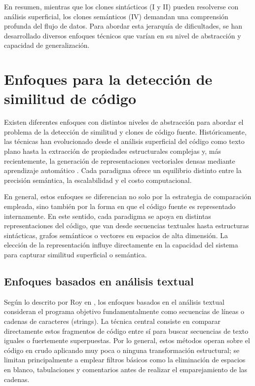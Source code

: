 
En resumen, mientras que los clones sintácticos (I y II) pueden resolverse con análisis superficial, los clones semánticos (IV) demandan una comprensión profunda del flujo de datos. Para abordar esta jerarquía de dificultades, se han desarrollado diversos enfoques técnicos que varían en su nivel de abstracción y capacidad de generalización.


\section{Enfoques para la detección de similitud de código}

Existen diferentes enfoques con distintos niveles de abstracción para abordar el problema de la detección de similitud y clones de código fuente. Históricamente, las técnicas han evolucionado desde el análisis superficial del código como texto plano hasta la extracción de propiedades estructurales complejas y, más recientemente, la generación de representaciones vectoriales densas mediante aprendizaje automático \cite{Roy2007Survey}. Cada paradigma ofrece un equilibrio distinto entre la precisión semántica, la escalabilidad y el costo computacional.

En general, estos enfoques se diferencian no solo por la estrategia de comparación empleada, sino también por la forma en que el código fuente es representado internamente. En este sentido, cada paradigma se apoya en distintas representaciones del código, que van desde secuencias textuales hasta estructuras sintácticas, grafos semánticos o vectores en espacios de alta dimensión. La elección de la representación influye directamente en la capacidad del sistema para capturar similitud superficial o semántica.

\subsection{Enfoques basados en análisis textual}

Según lo descrito por Roy en \cite{Roy2007Survey}, los enfoques basados en el análisis textual consideran el programa objetivo fundamentalmente como secuencias de líneas o cadenas de caracteres (strings). La técnica central consiste en comparar directamente estos fragmentos de código entre sí para buscar secuencias de texto iguales o fuertemente superpuestas. Por lo general, estos métodos operan sobre el código en crudo aplicando muy poca o ninguna transformación estructural; se limitan principalmente a emplear filtros básicos como la eliminación de espacios en blanco, tabulaciones y comentarios antes de realizar el emparejamiento de las cadenas.

